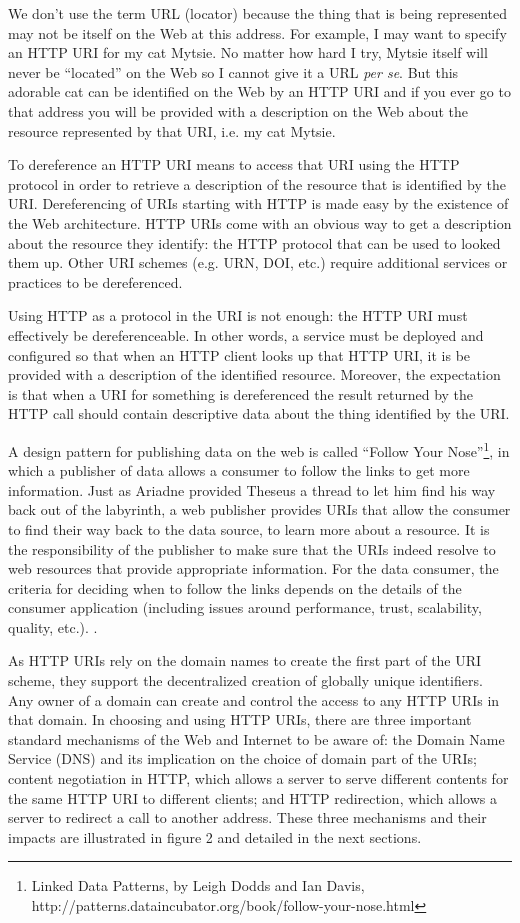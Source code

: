 We don't use the term URL (locator) because the thing that is being
represented may not be itself on the Web at this address. For example, I
may want to specify an HTTP URI for my cat Mytsie. No matter how hard I
try, Mytsie itself will never be ``located'' on the Web so I cannot give
it a URL \emph{per se}. But this adorable cat can be identified on the
Web by an HTTP URI and if you ever go to that address you will be
provided with a description on the Web about the resource represented by
that URI, i.e. my cat Mytsie.

To dereference an HTTP URI means to access that URI using the HTTP
protocol in order to retrieve a description of the resource that is
identified by the URI. Dereferencing of URIs starting with HTTP is made
easy by the existence of the Web architecture. HTTP URIs come with an
obvious way to get a description about the resource they identify: the
HTTP protocol that can be used to looked them up. Other URI schemes
(e.g. URN, DOI, etc.) require additional services or practices to be
dereferenced.

Using HTTP as a protocol in the URI is not enough: the HTTP URI must
effectively be dereferenceable. In other words, a service must be
deployed and configured so that when an HTTP client looks up that HTTP
URI, it is be provided with a description of the identified resource.
Moreover, the expectation is that when a URI for something is
dereferenced the result returned by the HTTP call should contain
descriptive data about the thing identified by the URI.

A design pattern for publishing data on the web is called ``Follow Your
Nose''\footnote{Linked Data Patterns, by Leigh Dodds and Ian Davis,
  http://patterns.dataincubator.org/book/follow-your-nose.html}, in
which a publisher of data allows a consumer to follow the links to get
more information. Just as Ariadne provided Theseus a thread to let him
find his way back out of the labyrinth, a web publisher provides URIs
that allow the consumer to find their way back to the data source, to
learn more about a resource. It is the responsibility of the publisher
to make sure that the URIs indeed resolve to web resources that provide
appropriate information. For the data consumer, the criteria for
deciding when to follow the links depends on the details of the consumer
application (including issues around performance, trust, scalability,
quality, etc.). .

As HTTP URIs rely on the domain names to create the first part of the
URI scheme, they support the decentralized creation of globally unique
identifiers. Any owner of a domain can create and control the access to
any HTTP URIs in that domain. In choosing and using HTTP URIs, there are
three important standard mechanisms of the Web and Internet to be aware
of: the Domain Name Service (DNS) and its implication on the choice of
domain part of the URIs; content negotiation in HTTP, which allows a
server to serve different contents for the same HTTP URI to different
clients; and HTTP redirection, which allows a server to redirect a call
to another address. These three mechanisms and their impacts are
illustrated in figure 2 and detailed in the next sections.



